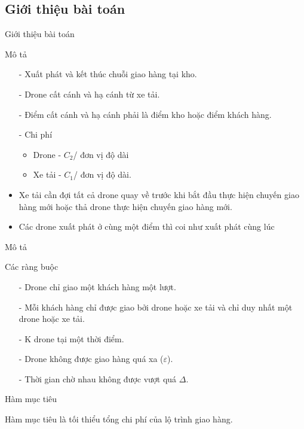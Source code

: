 \documentclass[compress]{beamer}
\begin{document}
\subsection{Giới thiệu bài toán}
\begin{frame}{Giới thiệu bài toán}
\begin{block}{Mô tả}
\begin{itemize}
\item[-] Xuất phát và kết thúc chuỗi giao hàng tại kho.
\item[-] Drone cất cánh và hạ cánh từ xe tải.
\item[-] Điểm cất cánh và hạ cánh phải là điểm kho hoặc điểm khách hàng.
\item[-] Chi phí \begin{itemize}
\item Drone - $C_2$/ đơn vị độ dài
\item Xe tải - $C_1$/ đơn vị độ dài.
\end{itemize}
\item Xe tải cần đợi tất cả drone quay về trước khi bắt đầu thực hiện chuyến giao hàng mới hoặc thả drone thực hiện chuyến giao hàng mới.
\item Các drone xuất phát ở cùng một điểm thì coi như xuất phát cùng lúc
\end{itemize}
\end{block}
\end{frame}
\begin{frame}{Mô tả}


\begin{block}{Các ràng buộc}
\begin{itemize}

\item[-] Drone chỉ giao một khách hàng một lượt.
\item[-] Mỗi khách hàng chỉ được giao bởi drone hoặc xe tải và chỉ duy nhất một drone hoặc xe tải.
\item[-] K drone tại một thời điểm.
\item[-] Drone không được giao hàng quá xa ($\varepsilon$).
\item[-] Thời gian chờ nhau không được vượt quá $\Delta$.


\end{itemize}
\end{block}

\begin{block}{Hàm mục tiêu}

Hàm mục tiêu là tối thiểu tổng chi phí của lộ trình giao hàng.
\end{block}
\end{frame}
\end{document}

